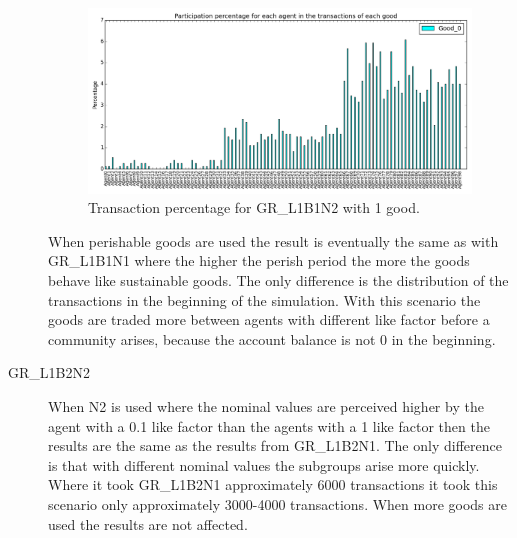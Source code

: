 \documentclass[twoside,openright]{uva-bachelor-thesis}
\begin{document}
\begin{description}
\begin{figure}[h!]
\centering
\includegraphics[scale=0.4]{Simulation2_figures/GR_L1B2N1_1good_5k} 
\caption{Transaction percentage for GR\_L1B1N2 with 1 good.}
\end{figure}


When perishable goods are used the result is eventually the same as with GR\_L1B1N1 where the higher the perish period the more the goods behave like sustainable goods. The only difference is the distribution of the transactions in the beginning of the simulation. With this scenario the goods are traded more between agents with different like factor before a community arises, because the account balance is not 0 in the beginning. 

\item[GR\_L1B2N2] When N2 is used where the nominal values are perceived higher by the agent with a 0.1 like factor than the agents with a 1 like factor then the results are the same as the results from GR\_L1B2N1. The only difference is that with different nominal values the subgroups arise more quickly. Where it took GR\_L1B2N1 approximately 6000 transactions it took this scenario only approximately 3000-4000 transactions. When more goods are used the results are not affected.


\end{description}
\end{document}
